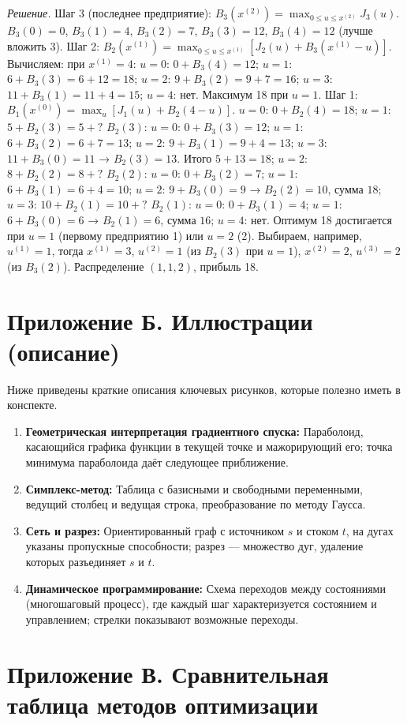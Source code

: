 \documentclass{article}
\theoremstyle{plain}
\begin{document}
\textit{Решение.} Шаг 3 (последнее предприятие): $B_3(x^{(2)})=\max_{0\le u\le x^{(2)}} J_3(u)$. $B_3(0)=0$, $B_3(1)=4$, $B_3(2)=7$, $B_3(3)=12$, $B_3(4)=12$ (лучше вложить 3). Шаг 2: $B_2(x^{(1)})=\max_{0\le u\le x^{(1)}} [J_2(u)+B_3(x^{(1)}-u)]$. Вычисляем: при $x^{(1)}=4$: $u=0$: $0+B_3(4)=12$; $u=1$: $6+B_3(3)=6+12=18$; $u=2$: $9+B_3(2)=9+7=16$; $u=3$: $11+B_3(1)=11+4=15$; $u=4$: нет. Максимум 18 при $u=1$. Шаг 1: $B_1(x^{(0)})=\max_{u}[J_1(u)+B_2(4-u)]$. $u=0$: $0+B_2(4)=18$; $u=1$: $5+B_2(3)=5+?$ $B_2(3)$: $u=0$: $0+B_3(3)=12$; $u=1$: $6+B_3(2)=6+7=13$; $u=2$: $9+B_3(1)=9+4=13$; $u=3$: $11+B_3(0)=11$ → $B_2(3)=13$. Итого $5+13=18$; $u=2$: $8+B_2(2)=8+?$ $B_2(2)$: $u=0$: $0+B_3(2)=7$; $u=1$: $6+B_3(1)=6+4=10$; $u=2$: $9+B_3(0)=9$ → $B_2(2)=10$, сумма $18$; $u=3$: $10+B_2(1)=10+?$ $B_2(1)$: $u=0$: $0+B_3(1)=4$; $u=1$: $6+B_3(0)=6$ → $B_2(1)=6$, сумма $16$; $u=4$: нет. Оптимум 18 достигается при $u=1$ (первому предприятию 1) или $u=2$ (2). Выбираем, например, $u^{(1)}=1$, тогда $x^{(1)}=3$, $u^{(2)}=1$ (из $B_2(3)$ при $u=1$), $x^{(2)}=2$, $u^{(3)}=2$ (из $B_3(2)$). Распределение $(1,1,2)$, прибыль 18.

\section*{Приложение Б. Иллюстрации (описание)}

Ниже приведены краткие описания ключевых рисунков, которые полезно иметь в конспекте.

\begin{enumerate}
  \item \textbf{Геометрическая интерпретация градиентного спуска:} Параболоид, касающийся графика функции в текущей точке и мажорирующий его; точка минимума параболоида даёт следующее приближение.
  \item \textbf{Симплекс-метод:} Таблица с базисными и свободными переменными, ведущий столбец и ведущая строка, преобразование по методу Гаусса.
  \item \textbf{Сеть и разрез:} Ориентированный граф с источником $s$ и стоком $t$, на дугах указаны пропускные способности; разрез — множество дуг, удаление которых разъединяет $s$ и $t$.
  \item \textbf{Динамическое программирование:} Схема переходов между состояниями (многошаговый процесс), где каждый шаг характеризуется состоянием и управлением; стрелки показывают возможные переходы.
\end{enumerate}

\section*{Приложение В. Сравнительная таблица методов оптимизации}
\end{document}
